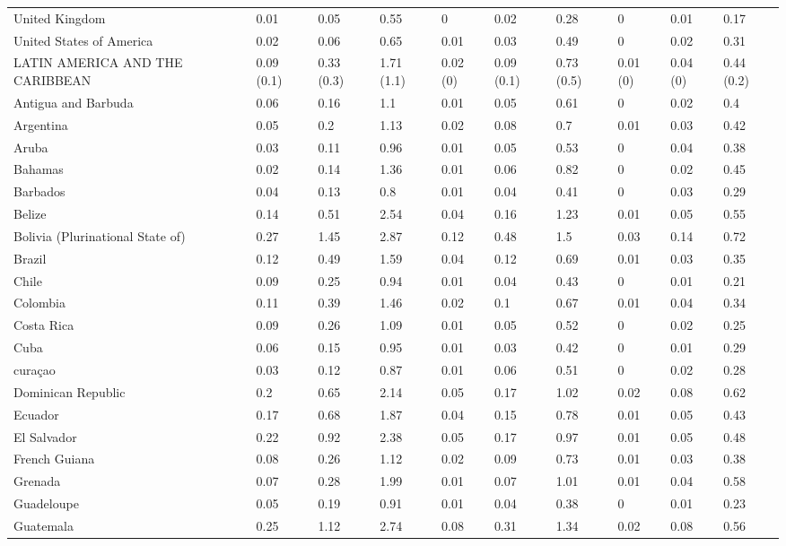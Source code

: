 \begin{longtable}[t]{llllllllll}
United Kingdom & 0.01 & 0.05 & 0.55 & 0 & 0.02 & 0.28 & 0 & 0.01 & 0.17\\
United States of America & 0.02 & 0.06 & 0.65 & 0.01 & 0.03 & 0.49 & 0 & 0.02 & 0.31\\
LATIN AMERICA AND THE CARIBBEAN & 0.09 (0.1) & 0.33 (0.3) & 1.71 (1.1) & 0.02 (0) & 0.09 (0.1) & 0.73 (0.5) & 0.01 (0) & 0.04 (0) & 0.44 (0.2)\\
Antigua and Barbuda & 0.06 & 0.16 & 1.1 & 0.01 & 0.05 & 0.61 & 0 & 0.02 & 0.4\\
Argentina & 0.05 & 0.2 & 1.13 & 0.02 & 0.08 & 0.7 & 0.01 & 0.03 & 0.42\\
Aruba & 0.03 & 0.11 & 0.96 & 0.01 & 0.05 & 0.53 & 0 & 0.04 & 0.38\\
Bahamas & 0.02 & 0.14 & 1.36 & 0.01 & 0.06 & 0.82 & 0 & 0.02 & 0.45\\
Barbados & 0.04 & 0.13 & 0.8 & 0.01 & 0.04 & 0.41 & 0 & 0.03 & 0.29\\
Belize & 0.14 & 0.51 & 2.54 & 0.04 & 0.16 & 1.23 & 0.01 & 0.05 & 0.55\\
Bolivia (Plurinational State of) & 0.27 & 1.45 & 2.87 & 0.12 & 0.48 & 1.5 & 0.03 & 0.14 & 0.72\\
Brazil & 0.12 & 0.49 & 1.59 & 0.04 & 0.12 & 0.69 & 0.01 & 0.03 & 0.35\\
Chile & 0.09 & 0.25 & 0.94 & 0.01 & 0.04 & 0.43 & 0 & 0.01 & 0.21\\
Colombia & 0.11 & 0.39 & 1.46 & 0.02 & 0.1 & 0.67 & 0.01 & 0.04 & 0.34\\
Costa Rica & 0.09 & 0.26 & 1.09 & 0.01 & 0.05 & 0.52 & 0 & 0.02 & 0.25\\
Cuba & 0.06 & 0.15 & 0.95 & 0.01 & 0.03 & 0.42 & 0 & 0.01 & 0.29\\
curaçao & 0.03 & 0.12 & 0.87 & 0.01 & 0.06 & 0.51 & 0 & 0.02 & 0.28\\
Dominican Republic & 0.2 & 0.65 & 2.14 & 0.05 & 0.17 & 1.02 & 0.02 & 0.08 & 0.62\\
Ecuador & 0.17 & 0.68 & 1.87 & 0.04 & 0.15 & 0.78 & 0.01 & 0.05 & 0.43\\
El Salvador & 0.22 & 0.92 & 2.38 & 0.05 & 0.17 & 0.97 & 0.01 & 0.05 & 0.48\\
French Guiana & 0.08 & 0.26 & 1.12 & 0.02 & 0.09 & 0.73 & 0.01 & 0.03 & 0.38\\
Grenada & 0.07 & 0.28 & 1.99 & 0.01 & 0.07 & 1.01 & 0.01 & 0.04 & 0.58\\
Guadeloupe & 0.05 & 0.19 & 0.91 & 0.01 & 0.04 & 0.38 & 0 & 0.01 & 0.23\\
Guatemala & 0.25 & 1.12 & 2.74 & 0.08 & 0.31 & 1.34 & 0.02 & 0.08 & 0.56\\

\end{longtable}
